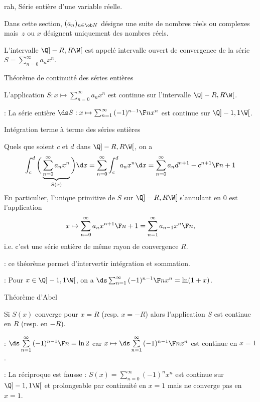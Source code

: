 %


\Subsection rah, Série entière d'une variable réelle. 

Dans cette section, $(a_n)_{n\in\ob N}$ désigne une suite de nombres réels ou complexes 
mais~$z$ ou $x$ désignent uniquement des nombres réels. 
\bigskip

\Definition [$\sum_{n=0}^\infty a_nx^n$ de rayon de convergence~$R>0$] 
L'intervalle $\Q]-R,R\W[$ est appelé intervalle ouvert de convergence de la série $S=\sum_{n=0}^\infty a_nx^n$. 

\Concept Théorème de continuité des séries entières

\Theoreme [$\sum_{n=0}^\infty a_n x^n$ de rayon de convergence $R>0$ ou~${R=\infty}$] 
L'application $S:x\mapsto\sum_{n=0}^\infty a_nx^n$ est continue sur l'intervalle $\Q]-R,R\W[$. 

\Application : La série entière $\ds S:x\mapsto\sum_{n=1}^{\infty}{(-1)^{n-1}\F n}x^n$ est continue sur $\Q]-1,1\W[$. 

\Concept Intégration terme à terme des séries entières

\Theoreme [$S=$ de rayon de convergence $R>0$ ou~$R=\infty$] 
Quels que soient $c$ et $d$ dans $\Q]-R,R\W[$, on a 
$$
\int_c^d\bigg(\underbrace{\sum\limits_{n=0}^\infty a_n x^n}_{S(x)}\bigg)\d x=\sum\limits_{n=0}^\infty\int_c^da_n x^n\d x=\sum\limits_{n=0}^\infty a_n{d^{n+1}-c^{n+1}\F n+1}
$$
En particulier, l'unique primitive de $S$ sur $\Q]-R,R\W[$ s'annulant en $0$ est l'application 
$$
x\mapsto\sum_{n=0}^\infty a_n{x^{n+1}\F n+1}=\sum_{n=1}^\infty a_{n-1}{x^n\F n}, 
$$
i.e. c'est une série entière de même rayon de convergence $R$. 

\Remarque : ce théorème permet d'intervertir intégration et sommation. 

\Application : Pour $x\in\Q]-1,1\W[$, on a $\ds \sum_{n=1}^\infty{(-1)^{n-1}\F n}x^n=\ln(1+x)$. 

\Concept Théorème d'Abel

\Theoreme [$S=\sum_{n=0}^\infty a_n x^n$ de rayon de convergence $R>0$] 
Si $S(x)$ converge pour $x=R$ (resp. $x=-R$) alors l'application $S$ est continue en $R$ (resp. en $-R$). 

\Application : $\ds\sum\limits_{n=1}^{\infty}{(-1)^{n-1}\F n}=\ln 2$ car $x\mapsto\ds \sum\limits_{n=1}^\infty{(-1)^{n-1}\F n}x^n$ est continue en $x=1$. 

\Remarque : La réciproque est fausse : $S(x)=\sum_{n=0}^\infty(-1)^nx^n$ est continue sur $\Q]-1,1\W[$ 
et prolongeable par continuité en $x=1$ mais ne converge pas en $x=1$. 

